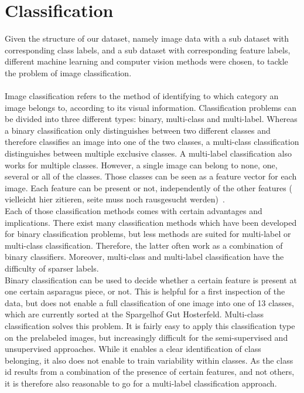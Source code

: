 %
\section{Classification}

Given the structure of our dataset, namely image data with a sub dataset with corresponding class labels, and a sub dataset with corresponding feature labels, different machine learning and computer vision methods were chosen, to tackle the problem of image classification. \\
\\
Image classification refers to the method of identifying to which category an image belongs to, according to its visual information.  Classification problems can be divided into three different types: binary, multi-class and multi-label. Whereas a binary classification only distinguishes between two different classes and therefore classifies an image into one of the two classes, a multi-class classification distinguishes between multiple exclusive classes. A multi-label classification also works for multiple classes. However, a single image can belong to none, one, several or all of the classes. Those classes can be seen as a feature vector for each image. Each feature can be present or not, independently of the other features ( vielleicht hier zitieren, seite muss noch rausgesucht werden)~\citep{har2003constraint}. \\

Each of those classification methods comes with certain advantages and implications.
There exist many classification methods which have been developed for binary classification problems, but less methods are suited for multi-label or multi-class classification. Therefore, the latter often work as a combination of binary classifiers. Moreover, multi-class and multi-label classification have the difficulty of sparser labels. \\

Binary classification can be used to decide whether a certain feature is present at one certain asparagus piece, or not. This is helpful for a first inspection of the data, but does not enable a full classification of one image into one of 13 classes, which are currently sorted at the Spargelhof Gut Hosterfeld. Multi-class classification solves this problem. It is fairly easy to apply this classification type on the prelabeled images, but increasingly difficult for the semi-supervised and unsupervised approaches. While it enables a clear identification of class belonging, it also does not enable to train variability within classes. As the class id results from a combination of the presence of certain features, and not others, it is therefore also reasonable to go for a multi-label classification approach. \\

